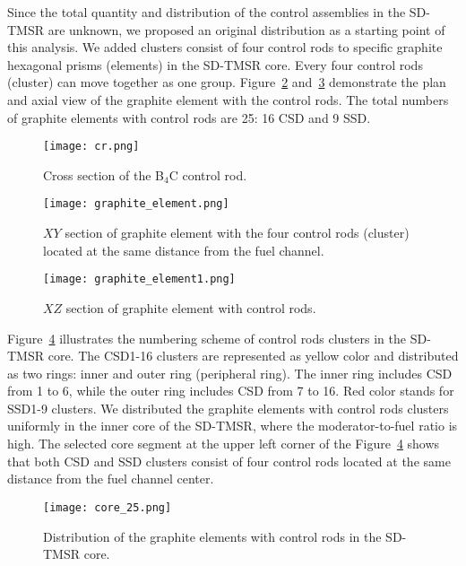 Since the total quantity and distribution of the control assemblies in the SD-TMSR are unknown, we proposed an original distribution as a starting point of this analysis. We added clusters consist of four control rods to specific graphite hexagonal prisms (elements) in the SD-TMSR core. Every four control rods (cluster) can move together as one group. Figure~\ref{fig:graphite_elemen} and~\ref{fig:graphite_elemen1} demonstrate the plan and axial view of the graphite element with the control rods. The total numbers of graphite elements with control rods are 25: 16 CSD and 9 SSD.
\begin{figure}[t!]  %
	\centering
	\hspace{+0.65in} 
	\texttt{[image: cr.png]}
	\caption{Cross section of the B$_4$C control rod.}
	\label{fig:cr}
\end{figure}
\begin{figure}[t!]  %
	\centering
	\hspace{+0.65in}
	\texttt{[image: graphite\_element.png]}
	\caption{$XY$ section of graphite element with the four control rods 
	(cluster) located at the same distance from the fuel channel.}
	\label{fig:graphite_elemen}
\end{figure}
\begin{figure}[t!]  %
	\centering
	\hspace{+0.65in}
	\texttt{[image: graphite\_element1.png]}
	\caption{$XZ$ section of graphite element with control rods.}
	\label{fig:graphite_elemen1}
\end{figure}

Figure~\ref{fig:core_25} illustrates the numbering scheme of control rods 
clusters in the SD-TMSR core.
The CSD1-16 clusters are represented as yellow color and distributed as two rings: inner and outer ring (peripheral ring). The inner ring includes CSD from 1 to 6, while the outer ring includes CSD from 7 to 16. Red color stands for SSD1-9 clusters.
We distributed the graphite elements with control rods clusters uniformly in 
the inner core of the SD-TMSR, where the moderator-to-fuel ratio is high.
The selected core segment at the upper left corner of the 
Figure~\ref{fig:core_25} shows that both CSD and SSD clusters consist of four 
control rods located at the same distance from the fuel channel center.
\begin{figure}[t!]  %
	\centering
	\hspace{+0.65in}
	\texttt{[image: core\_25.png]}
	\caption{Distribution of the graphite elements with control rods in the SD-TMSR core.}
	\label{fig:core_25}
\end{figure}

